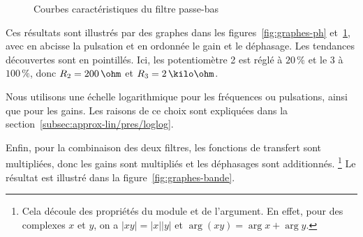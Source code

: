 \begin{figure}[h!]
    \centering
    \qquad
    \caption{Courbes caractéristiques du filtre passe-bas}
    \label{fig:graphes-pb}
\end{figure}

Ces résultats sont illustrés par des graphes dans
les figures~\ref{fig:graphes-ph} et~\ref{fig:graphes-pb},
avec en abcisse la pulsation
et en ordonnée le gain et le déphasage.
Les tendances découvertes sont en pointillés.
Ici, les potentiomètre 2 est réglé à $20\,\%$ et le 3 à $100\,\%$,
donc $R_2 = 200\,\ohm$ et $R_3 = 2\,\kilo\ohm$.

Nous utilisons une échelle logarithmique pour les fréquences
ou pulsations, ainsi que pour les gains.
Les raisons de ce choix sont expliquées dans
la section~\ref{subsec:approx-lin/pres/loglog}.

Enfin, pour la combinaison des deux filtres,
les fonctions de transfert sont multipliées,
donc les gains sont multipliés et les déphasages sont additionnés.%
\footnote{
    Cela découle des propriétés du module et de l'argument.
    En effet, pour des complexes $x$ et $y$,
    on a $|xy| = |x||y|$ et $\arg(xy) = \arg x + \arg y$.
}
Le résultat est illustré dans la figure~\ref{fig:graphes-bande}.

